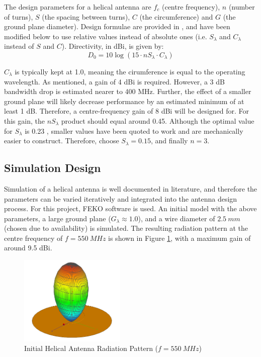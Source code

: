 
The design parameters for a helical antenna are $f_c$ (centre frequency), $n$ (number of turns), $S$ (the spacing between turns), $C$ (the circumference) and $G$ (the ground plane diameter). Design formulae are provided in \cite{textbook-antennaTheoryAnalysisDesign}, and have been modified below to use relative values instead of absolute ones (i.e. $S_\lambda$ and $C_\lambda$ instead of $S$ and $C$). Directivity, in dBi, is given by:
$$
D_0 = 10 \log(15 \cdot n S_\lambda \cdot C_\lambda)
$$

$C_\lambda$ is typically kept at 1.0, meaning the cirumference is equal to the operating wavelength. As mentioned, a gain of 4 dBi is required. However, a 3 dB bandwidth drop is estimated nearer to 400 MHz. Further, the effect of a smaller ground plane will likely decrease performance by an estimated minimum of at least 1 dB. Therefore, a centre-frequency gain of 8 dBi will be designed for. For this gain, the $n S_\lambda$ product should equal around 0.45. Although the optimal value for $S_\lambda$ is 0.23 \cite{textbook-antennaTheoryAnalysisDesign}, smaller values have been quoted to work \cite{site-helicalCalculator} and are mechanically easier to construct. Therefore, choose $S_\lambda = 0.15$, and finally $n = 3$.

\newpage
\subsection{Simulation Design}
Simulation of a helical antenna is well documented in literature, and therefore the parameters can be varied iteratively and integrated into the antenna design process. For this project, FEKO software is used. An initial model with the above parameters, a large ground plane ($G_\lambda \approx 1.0$), and a wire diameter of $\SI{2.5}{mm}$ (chosen due to availability) is simulated. The resulting radiation pattern at the centre frequency of $f = \SI{550}{MHz}$ is shown in Figure \ref{fig:helix1_pattern_550MHz}, with a maximum gain of around 9.5 dBi.

\begin{figure}[!htb]
  \centering
  \includegraphics[width=0.45\textwidth]{helix1_pattern_550MHz}
  \caption{Initial Helical Antenna Radiation Pattern ($f=\SI{550}{MHz}$)}
  \label{fig:helix1_pattern_550MHz}
\end{figure}

